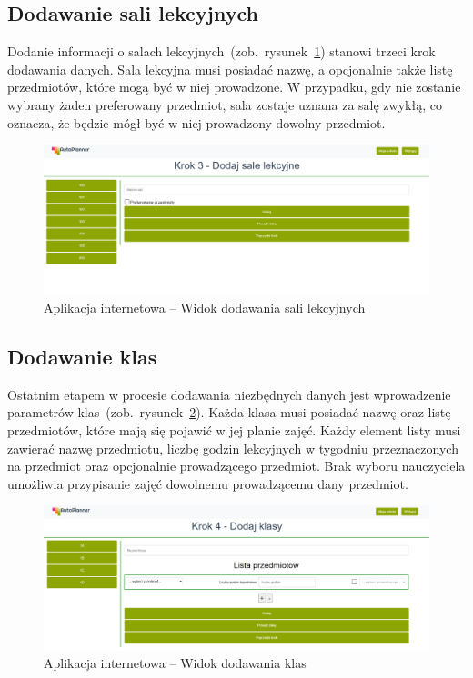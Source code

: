 \subsection{Dodawanie sali lekcyjnych}
Dodanie informacji o salach lekcyjnych~(zob.~rysunek~\ref{rys:classroom}) stanowi trzeci krok dodawania danych. Sala lekcyjna musi posiadać nazwę, a opcjonalnie także listę przedmiotów, które mogą być w  niej prowadzone. W przypadku, gdy nie zostanie wybrany żaden preferowany przedmiot, sala zostaje uznana za salę zwykłą, co oznacza, że będzie mógł być w niej prowadzony dowolny przedmiot.
\begin{figure}[!ht]
\centering\includegraphics[width=\textwidth]{figures/classroom}
\caption{Aplikacja internetowa -- Widok dodawania sali lekcyjnych}\label{rys:classroom}
\end{figure}
\subsection{Dodawanie klas}
Ostatnim etapem w procesie dodawania niezbędnych danych jest wprowadzenie parametrów klas~(zob.~rysunek~\ref{rys:class}). Każda klasa musi posiadać nazwę oraz listę przedmiotów, które mają się pojawić w jej planie zajęć. Każdy element listy musi zawierać nazwę przedmiotu, liczbę godzin lekcyjnych w tygodniu przeznaczonych na przedmiot oraz opcjonalnie prowadzącego przedmiot. Brak wyboru nauczyciela umożliwia przypisanie zajęć dowolnemu prowadzącemu dany przedmiot.
\begin{figure}[!ht]
\centering\includegraphics[width=\textwidth]{figures/class}
\caption{Aplikacja internetowa -- Widok dodawania klas}\label{rys:class}
\end{figure}
